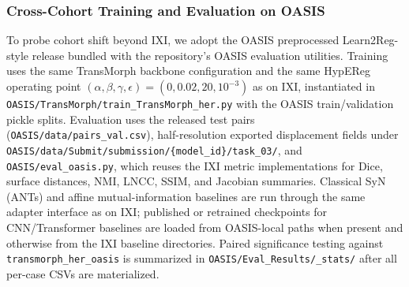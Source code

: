 \documentclass[jimaging,article,submit,pdftex,moreauthors]{Definitions/mdpi}
\begin{document}
\subsubsection{Cross-Cohort Training and Evaluation on OASIS}
To probe cohort shift beyond IXI, we adopt the OASIS preprocessed Learn2Reg-style release bundled with the repository's OASIS evaluation utilities. Training uses the same TransMorph backbone configuration and the same HypEReg operating point \((\alpha,\beta,\gamma,\epsilon)=(0,0.02,20,10^{-3})\) as on IXI, instantiated in \texttt{OASIS/TransMorph/train\_TransMorph\_her.py} with the OASIS train/validation pickle splits. Evaluation uses the released test pairs (\texttt{OASIS/data/pairs\_val.csv}), half-resolution exported displacement fields under \texttt{OASIS/data/Submit/submission/\{model\_id\}/task\_03/}, and \texttt{OASIS/eval\_oasis.py}, which reuses the IXI metric implementations for Dice, surface distances, NMI, LNCC, SSIM, and Jacobian summaries. Classical SyN (ANTs) and affine mutual-information baselines are run through the same adapter interface as on IXI; published or retrained checkpoints for CNN/Transformer baselines are loaded from OASIS-local paths when present and otherwise from the IXI baseline directories. Paired significance testing against \texttt{transmorph\_her\_oasis} is summarized in \texttt{OASIS/Eval\_Results/\_stats/} after all per-case CSVs are materialized.
\end{document}
